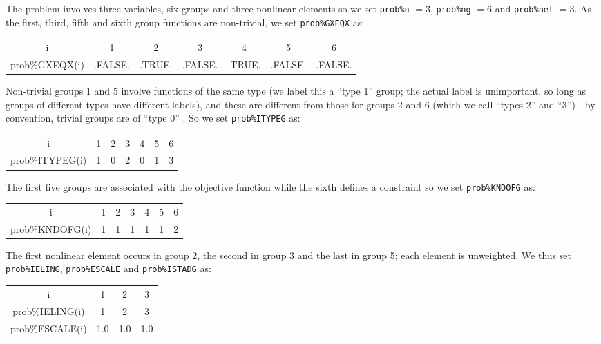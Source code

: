 \documentclass{galahad}
\begin{document}
The problem involves three variables, six groups
and three nonlinear elements so we set
      {\tt prob\%n} $= 3$,
      {\tt prob\%ng} $= 6$ and
      {\tt prob\%nel} $= 3$.
As the first, third, fifth and sixth group functions
are non-trivial, we set
{\tt prob\%GXEQX} as:

\begin{center}
{\tt \begin{tabular}{ccccccc}
i        & 1 & 2 & 3 & 4 & 5 & 6\\
prob\%GXEQX(i) & .FALSE. & .TRUE. & .FALSE. & .TRUE. & .FALSE. & .FALSE.
\end{tabular}}
\end{center}
Non-trivial groups 1 and 5 involve functions of the same type
(we label this a ``type 1'' group; the actual label is
unimportant, so long as groups of different types have different labels),
and these are different from
those for groups 2 and 6 (which we call ``types 2'' and ``3'')---by
convention, trivial groups are of ``type 0'' . So we
set {\tt prob\%ITYPEG} as:

\begin{center}
{\tt \begin{tabular}{ccccccc}
i        & 1 & 2 & 3 & 4 & 5 & 6\\
prob\%ITYPEG(i) & 1 & 0 & 2 & 0 & 1 & 3
\end{tabular}}
\end{center}
The first five groups are associated with the objective function
while the sixth defines a constraint so we set {\tt prob\%KNDOFG} as:

\begin{center}
{\tt \begin{tabular}{ccccccc}
i        & 1 & 2 & 3 & 4 & 5 & 6\\
prob\%KNDOFG(i) & 1 & 1 & 1 & 1 & 1 & 2
\end{tabular}}
\end{center}

The first nonlinear element occurs in group 2, the second
in group 3 and the last in group 5; each element is unweighted.
We thus set {\tt prob\%IELING}, {\tt prob\%ESCALE} and {\tt prob\%ISTADG} as:

\begin{center}
{\tt \begin{tabular}{cccc}
i         & 1 & 2 & 3\\
prob\%IELING(i) & 1 & 2 & 3\\
prob\%ESCALE(i) & 1.0 & 1.0 & 1.0
\end{tabular}}
\end{center}
\end{document}
